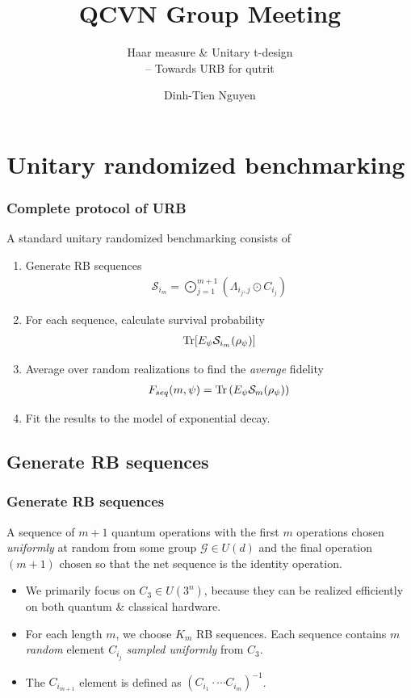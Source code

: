 \documentclass{beamer}
\title[ACRONYM] %
{QCVN Group Meeting}
\subtitle{Haar measure \& Unitary t-design\\-- Towards URB for qutrit}
\author[] %
{Dinh-Tien Nguyen}
\institute[] %
{
Faculty of Physics\\
VNU University of Science
}
\date{}
\begin{document}
\frame{\titlepage}
\tableofcontents
\section{Unitary randomized benchmarking}
\begin{frame}
  \frametitle{Complete protocol of URB}
  A standard unitary randomized benchmarking consists of 
  \begin{enumerate}
    \item Generate RB sequences
    \begin{align} 
      \mathcal{S}_{i_m}=\bigodot_{j=1}^{m+1}(\Lambda_{i_j,j}\odot C_{i_j})
    \end{align}
    \item For each sequence, calculate survival probability
    \begin{align}
      \Tr[E_\psi\mathcal{S}_{i_m}(\rho_\psi)]
    \end{align}
    \item Average over random realizations to find the \textit{average} fidelity
    \begin{align} 
      F_{seq}(m,\psi) = \Tr\left(E_\psi \mathcal{S}_m(\rho_\psi)\right)
    \end{align}
    \item Fit the results to the model of exponential decay.
  \end{enumerate}
\end{frame}
\subsection{Generate RB sequences}
\begin{frame}
  \frametitle{Generate RB sequences}
  \begin{definition}
    A sequence of $m+1$ quantum operations with the first $m$ operations chosen \textit{uniformly} at random from some group $\mathcal{G}\in U(d)$ and the final operation $(m+1)$ chosen so that the net sequence is the identity operation.
  \end{definition}
  \begin{itemize}
    \item We primarily focus on $C_3\in U(3^n)$, because they can be realized efficiently on both quantum \& classical hardware.
    \item For each length $m$, we choose $K_m$ RB sequences. Each sequence contains $m$ \textit{random} element $C_{i_j}$ \textit{sampled uniformly} from $C_3$.
    \item The $C_{i_{m+1}}$ element is defined as $(C_{i_1}\cdot\cdots C_{i_m})^{-1}$.
  \end{itemize}
\end{frame}
\end{document}
